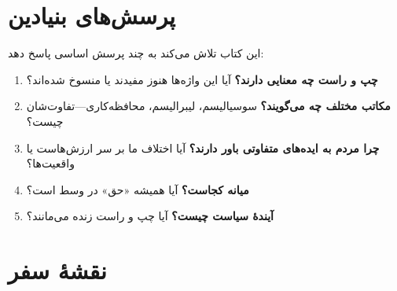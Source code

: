 \section*{پرسش‌های بنیادین}

این کتاب تلاش می‌کند به چند پرسش اساسی پاسخ دهد:

\begin{enumerate}[label=\textbf{پرسش \arabic*:}, leftmargin=2cm]
    \item \textbf{چپ و راست چه معنایی دارند؟} آیا این واژه‌ها هنوز مفیدند یا منسوخ شده‌اند؟
    \item \textbf{مکاتب مختلف چه می‌گویند؟} سوسیالیسم، لیبرالیسم، محافظه‌کاری—تفاوت‌شان چیست؟
    \item \textbf{چرا مردم به ایده‌های متفاوتی باور دارند؟} آیا اختلاف ما بر سر ارزش‌هاست یا واقعیت‌ها؟
    \item \textbf{میانه کجاست؟} آیا همیشه «حق» در وسط است؟
    \item \textbf{آیندهٔ سیاست چیست؟} آیا چپ و راست زنده می‌مانند؟
\end{enumerate}

\section*{نقشهٔ سفر}

